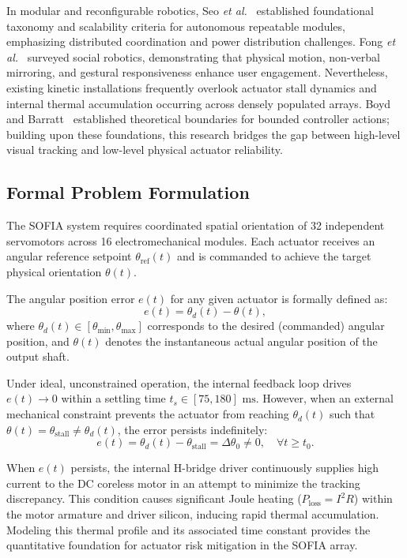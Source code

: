 \documentclass[lettersize,journal]{IEEEtran}
\begin{document}
In modular and reconfigurable robotics, Seo \textit{et al.}~\cite{seo2019modular} established foundational taxonomy and scalability criteria for autonomous repeatable modules, emphasizing distributed coordination and power distribution challenges. Fong \textit{et al.}~\cite{fong2003social} surveyed social robotics, demonstrating that physical motion, non-verbal mirroring, and gestural responsiveness enhance user engagement. Nevertheless, existing kinetic installations frequently overlook actuator stall dynamics and internal thermal accumulation occurring across densely populated arrays. Boyd and Barratt~\cite{boyd1991linear} established theoretical boundaries for bounded controller actions; building upon these foundations, this research bridges the gap between high-level visual tracking and low-level physical actuator reliability.

\subsection{Formal Problem Formulation}
\label{sec:problem_formulation}

The SOFIA system requires coordinated spatial orientation of 32 independent servomotors across 16 electromechanical modules. Each actuator receives an angular reference setpoint $\theta_{\text{ref}}(t)$ and is commanded to achieve the target physical orientation $\theta(t)$.

The angular position error $e(t)$ for any given actuator is formally defined as:
\begin{equation}
e(t) = \theta_d(t) - \theta(t),
\label{eq:position_error}
\end{equation}
where $\theta_d(t) \in [\theta_{\min}, \theta_{\max}]$ corresponds to the desired (commanded) angular position, and $\theta(t)$ denotes the instantaneous actual angular position of the output shaft.

Under ideal, unconstrained operation, the internal feedback loop drives $e(t) \to 0$ within a settling time $t_s \in [75, 180]\text{ ms}$. However, when an external mechanical constraint prevents the actuator from reaching $\theta_d(t)$ such that $\theta(t) = \theta_{\text{stall}} \neq \theta_d(t)$, the error persists indefinitely:
\begin{equation}
e(t) = \theta_d(t) - \theta_{\text{stall}} = \Delta\theta_0 \neq 0, \quad \forall t \ge t_0.
\label{eq:persistent_error}
\end{equation}

When $e(t)$ persists, the internal H-bridge driver continuously supplies high current to the DC coreless motor in an attempt to minimize the tracking discrepancy. This condition causes significant Joule heating ($P_{\text{loss}} = I^2 R$) within the motor armature and driver silicon, inducing rapid thermal accumulation. Modeling this thermal profile and its associated time constant provides the quantitative foundation for actuator risk mitigation in the SOFIA array.
\end{document}
